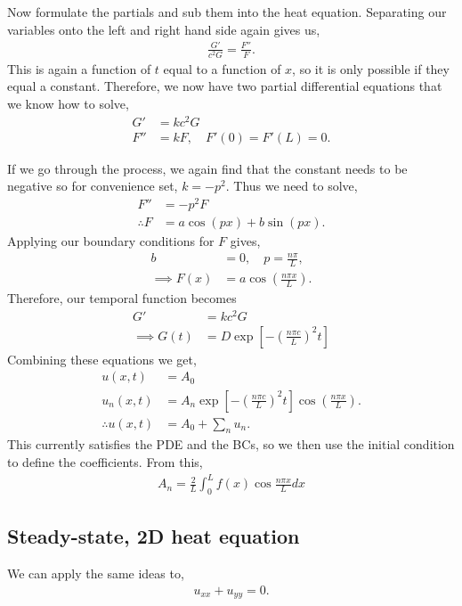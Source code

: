 \documentclass[11pt,a4paper]{report}
\theoremstyle{definition}
\begin{document}
Now formulate the partials and sub them into the heat equation. Separating our variables onto the left and right hand side again gives us,
\begin{align*}
	\frac{G'}{c^2G} = \frac{F''}{F}.
\end{align*}
This is again a function of $t$ equal to a function of $x$, so it is only possible if they equal a constant. Therefore, we now have two partial differential equations that we know how to solve,
\begin{align*}
	G' &= kc^2 G \\
	F''&= kF, \quad F'(0)=F'(L)=0.
\end{align*}

If we go through the process, we again find that the constant needs to be negative so for convenience set, $k=-p^2$. Thus we need to solve,
\begin{align*}
	F'' &= -p^2 F \\
	\therefore F &= a \cos(px) + b\sin(px).
\end{align*}
Applying our boundary conditions for $F$ gives,
\begin{align*}
	b&=0, \quad p = \frac{n\pi}{L}, \\
\implies	F(x) &= a\cos\left(\frac{n\pi x}{L}\right).
\end{align*}
Therefore, our temporal function becomes
\begin{align*}
	G' &= kc^2 G \\
	\implies G(t) &= D \exp\left[-\left(\frac{n\pi c}{L}\right)^2 t\right]
\end{align*}
Combining these equations we get,
\begin{align*}
u(x,t) &= A_0 \\
u_n(x,t) &= A_n\exp\left[-\left(\frac{n\pi c}{L}\right)^2 t\right]\cos\left(\frac{n\pi x}{L}\right). \\
\therefore u(x,t) &= A_0 + \sum_n u_n.
\end{align*}
This currently satisfies the PDE and the BCs, so we then use the initial condition to define the coefficients. From this,
\begin{align*}
	A_n = \frac{2}{L} \int_0^L f(x) \cos \frac{n\pi x}{L} dx
\end{align*}

\subsection{Steady-state, 2D heat equation}
We can apply the same ideas to,
\begin{align*}
	u_{xx} + u_{yy} = 0.
\end{align*}
\end{document}
